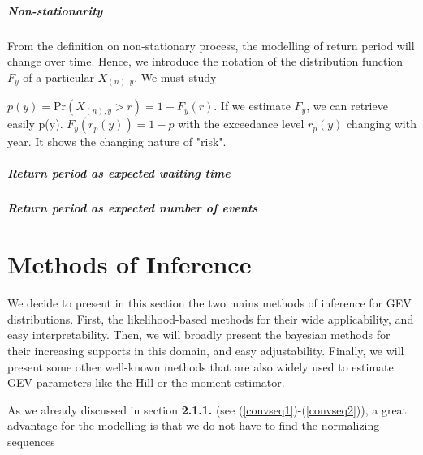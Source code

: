 \documentclass[11pt,a4paper,openany ]{book}
\makeatletter
\renewcommand\part{%
	\if@openright
	\cleardoublepage
	\else
	\clearpage
	\fi
	\thispagestyle{empty}%
	\if@twocolumn
	\onecolumn
	\@tempswatrue
	\else
	\@tempswafalse
	\fi
	\null\vfil
	\secdef\@part\@spart}
\makeatother
\begin{document}
\paragraph{Non-stationarity}

From the definition on non-stationary process, the modelling of return period will change over time.
Hence, we introduce the notation of the distribution function $F_y$ of a particular $X_{(n),y}$. We must study 

$p(y)=\text{Pr}(X_{(n),y}>r)=1-F_y(r)$. If we estimate $F_y$, we can retrieve easily p(y).
$F_y(r_p(y))=1-p$ with the exceedance level $r_p(y)$ changing with year. It shows the changing nature of "risk".

\paragraph{Return period as expected waiting time}

\paragraph{Return period as expected number of events}






\part{Inferential Methods}


\chapter{Methods of Inference}\label{sec::4} 
\minitoc\thispagestyle{empty}

We decide to present in this section the two mains methods of inference for GEV distributions. First, the likelihood-based methods for their wide applicability, and easy interpretability. Then, we will broadly present the bayesian methods for their increasing supports in this domain, and easy adjustability. Finally, we will present some other well-known methods that are also widely used to estimate GEV parameters like the Hill or the moment estimator.

As we already discussed in section \textbf{2.1.1.} (see (\ref{convseq1})-(\ref{convseq2})), a great advantage for the modelling is that we do not have to find the normalizing sequences
\end{document}
